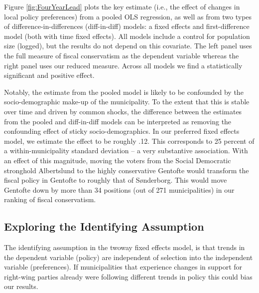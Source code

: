 \documentclass[a4paper,12pt]{article}
\begin{document}

Figure \ref{fig:FourYearLead} plots the key estimate (i.e., the effect of changes in local policy preferences) from a pooled OLS regression, as well as from two types of difference-in-differences (diff-in-diff) models: a fixed effects and first-difference model (both with time fixed effects). All models include a control for population size (logged), but the results do not depend on this covariate.  The  left panel uses the full measure of fiscal conservatism as the dependent variable whereas the right panel uses our reduced measure. Across all models we find a statistically significant and positive effect. 

Notably, the estimate from the pooled model is likely to be confounded by the socio-demographic make-up of the municipality. To the extent that this is stable over time and driven by common shocks, the difference between the estimates from the pooled and diff-in-diff models can be interpreted as removing the confounding effect of sticky socio-demographics. In our preferred fixed effects model, we estimate the effect to be roughly .12. This corresponds to 25 percent of a within-municipality standard deviation -- a very substantive association. With an effect of this magnitude, moving the voters from the Social Democratic stronghold Albertslund to the highly conservative Gentofte would transform the fiscal policy in Gentofte to roughly that of Sønderborg. This would move Gentofte down by more than 34 positions (out of 271 municipalities) in our ranking of fiscal conservatism.


\subsection*{Exploring the Identifying Assumption}
The identifying assumption in the twoway fixed effects model, is that trends in the dependent variable (policy) are independent of selection into the independent variable (preferences). If municipalities that experience changes in support for right-wing parties already were following different trends in policy this could bias our results. 
\end{document}
